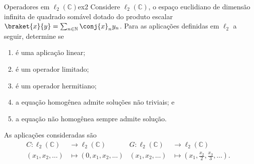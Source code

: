 \begin{exercício}{Operadores em \(\ell_2(\mathbb{C})\)}{ex2}
   Considere \(\ell_2(\mathbb{C})\), o espaço euclidiano  de dimensão infinita de quadrado somável dotado do produto escalar \(\braket{x}{y} = \sum_{n \in \mathbb{N}} \conj{x}_n y_n\). Para as aplicações definidas em \(\ell_2\) a seguir, determine se
   \begin{enumerate}[label=(\alph*)]
       \item é uma aplicação linear;
       \item é um operador limitado;
       \item é um operador hermitiano;
       \item a equação homogênea admite soluções não triviais; e 
       \item a equação não homogênea sempre admite solução.
   \end{enumerate}
   As aplicações consideradas são
   \begin{align*}
      C : \ell_2(\mathbb{C}) &\to \ell_2(\mathbb{C})&
      G : \ell_2(\mathbb{C}) &\to \ell_2(\mathbb{C})\\
      (x_1, x_2, \dots) &\mapsto (0, x_1, x_2, \dots)&
      (x_1, x_2, \dots) &\mapsto \left(x_1, \frac{x_2}{2}, \frac{x_3}{3}, \dots\right).
   \end{align*}
\end{exercício}
